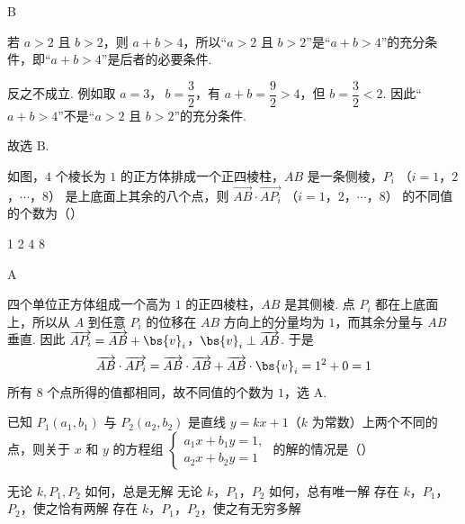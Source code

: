 \begin{answer}
B
\end{answer}

\begin{solution}
若 \(a>2\) 且 \(b>2\)，则 \(a+b>4\)，所以“\(a>2\) 且 \(b>2\)”是“\(a+b>4\)”的充分条件，即“\(a+b>4\)”是后者的必要条件.

反之不成立. 例如取 \(a=3\)，\(\ b=\dfrac32\)，有 \(a+b=\dfrac92>4\)，但 \(b=\dfrac32<2\). 因此“\(a+b>4\)”不是“\(a>2\) 且 \(b>2\)”的充分条件.

故选 B.
\end{solution}

\begin{problem}
如图，\(4\) 个棱长为 \(1\) 的正方体排成一个正四棱柱，\(AB\) 是一条侧棱，\( P_{i} \) （\(i=1\)，\(2\)，\(\cdots\)，\(8\)） 是上底面上其余的八个点，则 \( \overrightarrow{AB} \cdot \overrightarrow{AP_{i}} \) （\(i=1\)，\(2\)，\(\cdots\)，\(8\)） 的不同值的个数为（\quad）


\choices
    {1}
    {2}
    {4}
    {8}
\end{problem}

\begin{answer}
A
\end{answer}

\begin{solution}
四个单位正方体组成一个高为 \(1\) 的正四棱柱，\(AB\) 是其侧棱. 点 \(P_i\) 都在上底面上，所以从 \(A\) 到任意 \(P_i\) 的位移在 \(AB\) 方向上的分量均为 \(1\)，而其余分量与 \(AB\) 垂直. 因此
\(\overrightarrow{AP_i}=\overrightarrow{AB}+\bs{v}_{i}\)，\(\bs{v}_{i}\perp\overrightarrow{AB}\).
于是
\[
\overrightarrow{AB}\cdot\overrightarrow{AP_i}
=\overrightarrow{AB}\cdot\overrightarrow{AB}
+\overrightarrow{AB}\cdot\bs{v}_{i}
=1^2+0=1
\]
所有 \(8\) 个点所得的值都相同，故不同值的个数为 \(1\)，选 A.
\end{solution}

\begin{problem}
已知 \(P_{1}(a_{1}, b_{1})\) 与 \(P_{2}(a_{2}, b_{2})\) 是直线 \(y = kx + 1\)（\(k\) 为常数）上两个不同的点，则关于 \(x\) 和 \(y\) 的方程组 \(\begin{cases}
a_{1}x + b_{1}y = 1,\\
a_{2}x + b_{2}y = 1
\end{cases}\) 的解的情况是（\quad）

\choices
    {无论 \(k, P_{1}, P_{2}\) 如何，总是无解}
    {无论 \(k\)，\(P_{1}\)，\(P_{2}\) 如何，总有唯一解}
    {存在 \(k\)，\(P_{1}\)，\(P_{2}\)，使之恰有两解}
    {存在 \(k\)，\(P_{1}\)，\(P_{2}\)，使之有无穷多解}
\end{problem}


